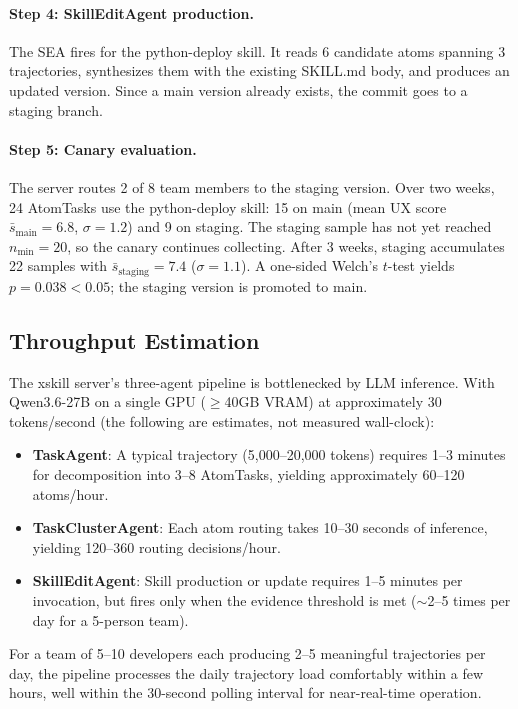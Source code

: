 \documentclass{article}
\begin{document}
\paragraph{Step 4: SkillEditAgent production.} The SEA fires for the python-deploy skill. It reads 6 candidate atoms spanning 3 trajectories, synthesizes them with the existing SKILL.md body, and produces an updated version. Since a main version already exists, the commit goes to a staging branch.

\paragraph{Step 5: Canary evaluation.} The server routes 2 of 8 team members to the staging version. Over two weeks, 24 AtomTasks use the python-deploy skill: 15 on main (mean UX score $\bar{s}_{\mathrm{main}} = 6.8$, $\sigma = 1.2$) and 9 on staging. The staging sample has not yet reached $n_{\min} = 20$, so the canary continues collecting. After 3 weeks, staging accumulates 22 samples with $\bar{s}_{\mathrm{staging}} = 7.4$ ($\sigma = 1.1$). A one-sided Welch's $t$-test yields $p = 0.038 < 0.05$; the staging version is promoted to main.

\subsection{Throughput Estimation}

The xskill server's three-agent pipeline is bottlenecked by LLM inference. With Qwen3.6-27B on a single GPU ($\geq$40GB VRAM) at approximately 30 tokens/second (the following are estimates, not measured wall-clock):
\begin{itemize}
    \item \textbf{TaskAgent}: A typical trajectory (5,000--20,000 tokens) requires 1--3 minutes for decomposition into 3--8 AtomTasks, yielding approximately 60--120 atoms/hour.
    \item \textbf{TaskClusterAgent}: Each atom routing takes 10--30 seconds of inference, yielding 120--360 routing decisions/hour.
    \item \textbf{SkillEditAgent}: Skill production or update requires 1--5 minutes per invocation, but fires only when the evidence threshold is met ($\sim$2--5 times per day for a 5-person team).
\end{itemize}

For a team of 5--10 developers each producing 2--5 meaningful trajectories per day, the pipeline processes the daily trajectory load comfortably within a few hours, well within the 30-second polling interval for near-real-time operation.
\end{document}
